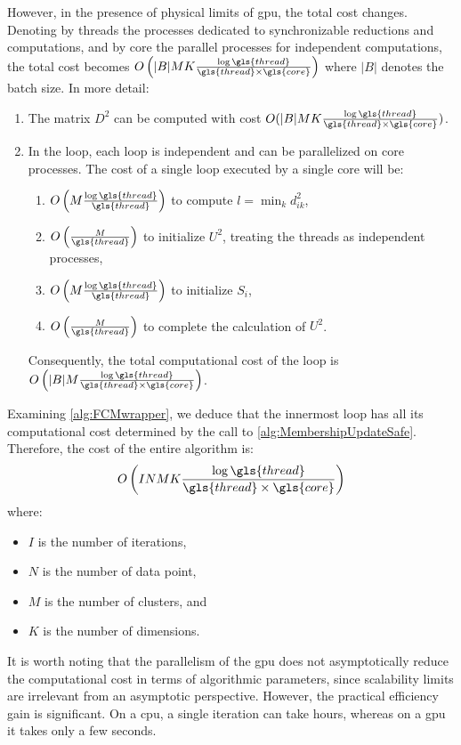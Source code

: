 \begin{toReview}
	\noindent However, in the presence of physical limits of \gls{gpu}, the total cost changes. Denoting by \gls{thread}s the processes dedicated to synchronizable reductions and computations, and by \gls{core} the parallel processes for independent computations, the total cost becomes $O\left(|B|MK\frac{\log\gls{thread}}{\gls{thread}\times\gls{core}}\right)$ where $|B|$ denotes the batch size. In more detail:
	\begin{enumerate}
		\item The matrix $D^2$ can be computed with cost $O(|B|MK\frac{\log\gls{thread}}{\gls{thread}\times\gls{core}})$.
		\item In the loop, each loop is independent and can be parallelized on \gls{core} processes. The cost of a single loop executed by a single \gls{core} will be: \begin{enumerate}
			\item $O\left(M\frac{\log{\gls{thread}}}{\gls{thread}}\right)$ to compute $l = \min_k{d_{ik}^2}$,
			\item $O\left(\frac{M}{\gls{thread}}\right)$ to initialize $U^2$, treating the \gls{thread}s as independent processes,
			\item $O\left(M\frac{\log\gls{thread}}{\gls{thread}}\right)$ to initialize $S_i$,
			\item $O\left(\frac{M}{\gls{thread}}\right)$ to complete the calculation of $U^2$.
		\end{enumerate}
		\noindent Consequently, the total computational cost of the loop is $O\left(|B|M\frac{\log\gls{thread}}{\gls{thread}\times\gls{core}}\right)$.
	\end{enumerate}

	\bigskip \noindent Examining \cref{alg:FCMwrapper}, we deduce that the innermost loop has all its computational cost determined by the call to \cref{alg:MembershipUpdateSafe}. Therefore, the cost of the entire algorithm is:
	\[
		O\left(INMK\frac{\log\gls{thread}}{\gls{thread}\times\gls{core}}\right)
	\]
	where:
	\begin{itemize}
		\item $I$ is the number of iterations,
		\item $N$ is the number of data point,
		\item $M$ is the number of clusters, and
		\item $K$ is the number of dimensions.
	\end{itemize}

	\noindent It is worth noting that the parallelism of the \gls{gpu} does not asymptotically reduce the computational cost in terms of algorithmic parameters, since scalability limits are irrelevant from an asymptotic perspective. However, the practical efficiency gain is significant. On a \gls{cpu}, a single iteration can take hours, whereas on a \gls{gpu} it takes only a few seconds.


\end{toReview}
